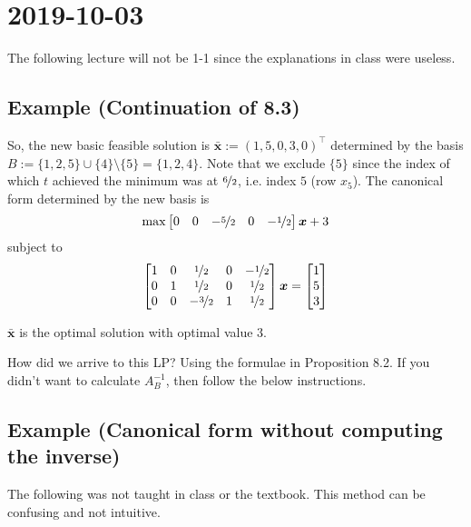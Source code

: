 \section{2019-10-03}
\begin{remark}
    The following lecture will not be 1-1 since the explanations in class were useless.
\end{remark}

\subsection{Example (Continuation of 8.3)}
So, the new basic feasible solution is $\bm{\bar{x}}:=(1,5,0,3,0)^\top$
determined by the basis $B:=\{1,2,5\}\cup\{4\}\setminus \{5\}=\{1,2,4\}$. Note that
we exclude $\{5\}$ since the index of which $t$ achieved the minimum was at
$\nicefrac{6}{2}$, i.e. index $5$ (row $x_5$). The canonical form determined by the new
basis is
\[\max \begin{bmatrix}
    0 & 0 & -\nicefrac{5}{2} & 0 & -\nicefrac{1}{2}
\end{bmatrix}\bm{x}+3\]
subject to
\[
    \begin{bmatrix}
        1 & 0 & \nicefrac{1}{2} & 0 & -\nicefrac{1}{2}\\
        0 & 1 & \nicefrac{1}{2} & 0 & \nicefrac{1}{2}\\
        0 & 0 & -\nicefrac{3}{2} & 1 & \nicefrac{1}{2}
    \end{bmatrix}\bm{x}
    =
    \begin{bmatrix}
        1\\
        5\\
        3
    \end{bmatrix}
\]
\begin{remark}
    $\bm{\bar{x}}$ is the optimal solution with optimal value $3$.
\end{remark}
\begin{remark}
    How did we arrive to this LP? Using the formulae in Proposition 8.2. If you didn't want to
    calculate $A_B^{-1}$, then follow the below instructions.
\end{remark}

\subsection{Example (Canonical form without computing the inverse)}
\begin{remark}
    The following was not taught in class or the textbook. 
    This method can be confusing and not intuitive.
\end{remark}


